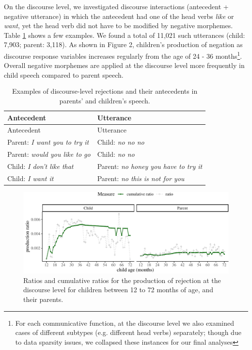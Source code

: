 \documentclass[
  english,
  man,floatsintext]{apa6}
\begin{document}
On the discourse level, we investigated discourse interactions (antecedent + negative utterance) in which the antecedent had one of the head verbs \emph{like} or \emph{want}, yet the head verb did not have to be modified by negative morphemes. Table \ref{tab:disreject} shows a few examples. We found a total of 11,021 such utterances (child: 7,903; parent: 3,118). As shown in Figure 2, children's production of negation as discourse response variables increases regularly from the age of 24 - 36 months\footnote{For each communicative function, at the discourse level we also examined cases of different subtypes (e.g. different head verbs) separately; though due to data sparsity issues, we collapsed these instances for our final analyses}. Overall negative morphemes are applied at the discourse level more frequently in child speech compared to parent speech.

\begin{longtable}[]{@{}ll@{}}
\caption{\label{tab:disreject} Examples of discourse-level rejections and their antecedents in parents' and children's speech.}\tabularnewline
\toprule
Antecedent & Utterance \\
\midrule
\endfirsthead
\toprule
Antecedent & Utterance \\
\midrule
\endhead
Parent: \emph{I want you to try it} & Child: \emph{no no no} \\
Parent: \emph{would you like to go} & Child: \emph{no no} \\
Child: \emph{I don't like that} & Parent: \emph{no honey you have to try it} \\
Child: \emph{I want it} & Parent: \emph{no this is not for you} \\
\bottomrule
\end{longtable}

\begin{figure}[H]

{\centering \includegraphics{neg_construction_article_files/figure-latex/emotiondiscourse-1} 

}

\caption{Ratios and cumulative ratios for the production of rejection at the discourse level for children between 12 to 72 months of age, and their parents.}\label{fig:emotiondiscourse}
\end{figure}
\end{document}
